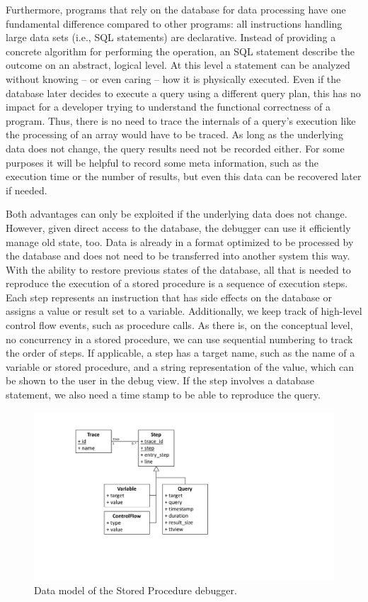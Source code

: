 Furthermore, programs that rely on the database for data processing have one fundamental difference compared to other programs:
all instructions handling large data sets (i.e., SQL statements) are declarative.
Instead of providing a concrete algorithm for performing the operation, an SQL statement describe the outcome on an abstract, logical level.
At this level a statement can be analyzed without knowing -- or even caring -- how it is physically executed.
Even if the database later decides to execute a query using a different query plan, this has no impact for a developer trying to understand the functional correctness of a program.
Thus, there is no need to trace the internals of a query's execution like the processing of an array would have to be traced.
As long as the underlying data does not change, the query results need not be recorded either.
For some purposes it will be helpful to record some meta information, such as the execution time or the number of results, but even this data can be recovered later if needed.

Both advantages can only be exploited if the underlying data does not change.
However, given direct access to the database, the debugger can use it efficiently manage old state, too.
Data is already in a format optimized to be processed by the database and does not need to be transferred into another system this way.
With the ability to restore previous states of the database, 
\tmpStart
all that is needed to reproduce the execution of a stored procedure is a sequence of execution steps.
Each step represents an instruction that has side effects on the database or assigns a value or result set to a variable.
Additionally, we keep track of high-level control flow events, such as procedure calls.
As there is, on the conceptual level, no concurrency in a stored procedure, we can use sequential numbering to track the order of steps.
If applicable, a step has a target name, such as the name of a variable or stored procedure, and a string representation of the value, which can be shown to the user in the debug view.
If the step involves a database statement, we also need a time stamp to be able to reproduce the query.
\tmpEnd

\begin{figure}
	\centering
		\includegraphics[width=0.7\linewidth]{img/model_sqlodb}
	\caption{Data model of the Stored Procedure debugger.}
	\label{fig:model_odb}
\end{figure}

